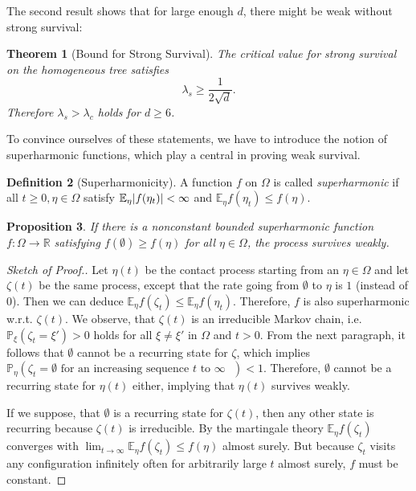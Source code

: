 \documentclass[a4paper,11pt]{amsart}
\theoremstyle{theorem}
\newtheorem{theorem}{Theorem}[section]
\newtheorem{proposition}[theorem]{Proposition}
\theoremstyle{definition}
\newtheorem{definition}[theorem]{Definition}
\newcommand{\R}{\mathbb{R}}
\newcommand{\E}{\mathbb{E}}
\renewcommand{\P}{\mathbb{P}}
\DeclarePairedDelimiter\abs{\lvert}{\rvert}%
\begin{document}
The second result shows that for large enough $d$, there might be weak without strong survival:
\begin{theorem}[Bound for Strong Survival]\label{thm:strong-survival}
	The critical value for strong survival on the homogeneous tree satisfies $$\lambda_s \geq \frac{1}{2\sqrt{d}}.$$
	Therefore $\lambda_s > \lambda_c$ holds for $d\geq 6$.
\end{theorem}

To convince ourselves of these statements, we have to introduce the notion of superharmonic functions, which play a central in proving weak survival.

\begin{definition}[Superharmonicity]
	A function $f$ on $\Omega$ is called \emph{superharmonic} if all $t\geq0, \eta\in\Omega$ satisfy $\E_\eta\abs{f(\eta_t)} < \infty$ and $\E_\eta f(\eta_t) \leq f(\eta)$.
\end{definition}

\begin{proposition}\label{prop:weak-survival}
	If there is a nonconstant bounded superharmonic function $f:\Omega\to \R$ satisfying $f(\emptyset)\geq f(\eta)$ for all $\eta\in\Omega$, the process survives weakly.
\end{proposition}

\begin{proof}[Sketch of Proof.]
	Let $\eta(t)$ be the contact process starting from an $\eta\in\Omega$ and let $\zeta(t)$ be the same process, except that the rate going from $\emptyset$ to $\eta$ is $1$ (instead of $0$).
	Then we can deduce $\E_\eta f(\zeta_t) \leq \E_\eta f(\eta_t)$.
	Therefore, $f$ is also superharmonic w.r.t. $\zeta(t)$.
	We observe, that $\zeta(t)$ is an irreducible Markov chain, i.e. $\P_\xi(\zeta_t = \xi') > 0$ holds for all $\xi\neq\xi'$ in $\Omega$ and $t > 0$.
	From the next paragraph, it follows that $\emptyset$ cannot be a recurring state for $\zeta$, which implies $\P_\eta( \zeta_t = \emptyset \text{ for an increasing sequence $t$ to $\infty$ }) < 1$.
	Therefore, $\emptyset$ cannot be a recurring state for $\eta(t)$ either, implying that $\eta(t)$ survives weakly.
	
	If we suppose, that $\emptyset$ is a recurring state for $\zeta(t)$, then any other state is recurring because $\zeta(t)$ is irreducible.
	By the martingale theory $\E_\eta f(\zeta_t)$ converges with $\lim_{t\to\infty} \E_\eta f(\zeta_t) \leq f(\eta)$ almost surely. 
	But because $\zeta_t$ visits any configuration infinitely often for arbitrarily large $t$ almost surely, $f$ must be constant.
\end{proof}
\end{document}
